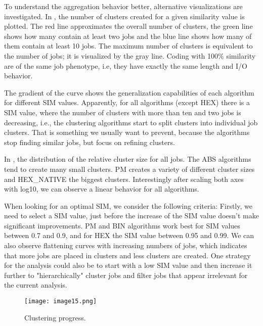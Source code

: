 \documentclass{jhps}
\begin{document}
\medskip

To understand the aggregation behavior better, alternative visualizations are investigated.
In , the number of clusters created for a given similarity value is plotted.
The red line approximates the overall number of clusters, the green line shows how many contain at least two jobs and the blue line shows how many of them contain at least 10 jobs.
The maximum number of clusters is equivalent to the number of jobs; it is visualized by the gray line.
Coding with 100$\%$  similarity are of the same job phenotype, i.e, they have exactly the same length and I/O behavior.

The gradient of the curve shows the generalization capabilities of each algorithm for different SIM values.
Apparently, for all algorithms (except HEX) there is a SIM value, where the number of clusters with more than ten and two jobs is decreasing, i.e., the clustering algorithms start to split clusters into individual job clusters.
That is something we usually want to prevent, because the algorithms stop finding similar jobs, but focus on refining clusters.

\smallskip

In , the distribution of the relative cluster size for all jobs.
The ABS algorithms tend to create many small clusters.
PM creates a variety of different cluster sizes and HEX\_NATIVE the biggest clusters.
Interestingly after scaling both axes with log10, we can observe a linear behavior for all algorithms.

When looking for an optimal SIM, we consider the following criteria:
Firstly, we need to select a SIM value, just before the increase of the SIM value doesn't make significant improvements.
PM and BIN algorithms work best for SIM values between 0.7 and 0.9, and for HEX the SIM value between 0.95 and 0.99.
We can also observe flattening curves with increasing numbers of jobs, which indicates that more jobs are placed in clusters and less clusters are created.
One strategy for the analysis could also be to start with a low SIM value and then increase it further to "hierarchically" cluster jobs and filter jobs that appear irrelevant for the current analysis.

\begin{figure}
  \centering
   \texttt{[image: image15.png]}
   \caption{Clustering progress.}
   \label{fig:clustering_progress}
\end{figure}
\end{document}
